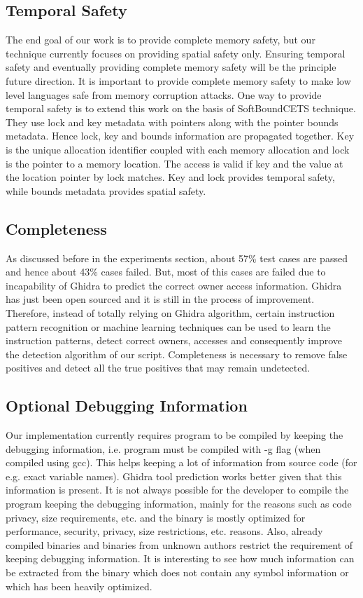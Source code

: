 \subsection*{Temporal Safety}
The end goal of our work is to provide complete memory safety, but our technique currently focuses on providing spatial safety only. Ensuring temporal safety and eventually providing complete memory safety will be the principle future direction. It is important to provide complete memory safety to make low level languages safe from memory corruption attacks. One way to provide temporal safety is to extend this work on the basis of SoftBoundCETS \citep{nagarakatte2015everything} technique. They use lock and key metadata with pointers along with the pointer bounds metadata. Hence lock, key and bounds information are propagated together. Key is the unique allocation identifier coupled with each memory allocation and lock is the pointer to a memory location. The access is valid if key and the value at the location pointer by lock matches. Key and lock provides temporal safety, while bounds metadata provides spatial safety.

\subsection*{Completeness}
As discussed before in the experiments section, about 57\% test cases are passed and hence about 43\% cases failed. But, most of this cases are failed due to incapability of Ghidra to predict the correct owner access information. Ghidra has just been open sourced and it is still in the process of improvement. Therefore, instead of totally relying on Ghidra algorithm, certain instruction pattern recognition or machine learning techniques can be used to learn the instruction patterns, detect correct owners, accesses and consequently improve the detection algorithm of our script. Completeness is necessary to remove false positives and detect all the true positives that may remain undetected.

\subsection*{Optional Debugging Information}
Our implementation currently requires program to be compiled by keeping the debugging information, i.e. program must be compiled with -g flag (when compiled using gcc). This helps keeping a lot of information from source code (for e.g. exact variable names). Ghidra tool prediction works better given that this information is present. It is not always possible for the developer to compile the program keeping the debugging information, mainly for the reasons such as code privacy, size requirements, etc. and the binary is mostly optimized for performance, security, privacy, size restrictions, etc. reasons. Also, already compiled binaries and binaries from unknown authors restrict the requirement of keeping debugging information. It is interesting to see how much information can be extracted from the binary which does not contain any symbol information or which has been heavily optimized.

